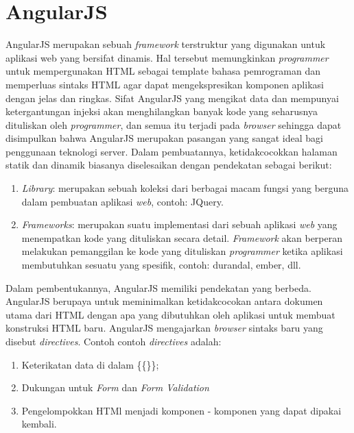 	
\section{AngularJS}
\label{sec: angularJS}
	
	AngularJS merupakan sebuah \textit{framework} terstruktur yang digunakan untuk aplikasi web yang bersifat dinamis. Hal tersebut memungkinkan \textit{programmer} untuk mempergunakan HTML sebagai template bahasa pemrograman dan memperluas sintaks HTML agar dapat mengekspresikan komponen aplikasi dengan jelas dan ringkas. Sifat AngularJS yang mengikat data dan mempunyai ketergantungan injeksi akan menghilangkan banyak kode yang seharusnya dituliskan oleh \textit{programmer}, dan semua itu terjadi pada \textit{browser} sehingga dapat disimpulkan bahwa AngularJS merupakan pasangan yang sangat ideal bagi penggunaan teknologi server. 
	Dalam pembuatannya, ketidakcocokkan halaman statik dan dinamik biasanya diselesaikan dengan pendekatan sebagai berikut:
	\begin{enumerate}
		\item \textit{Library}: merupakan sebuah koleksi dari berbagai macam fungsi yang berguna dalam pembuatan aplikasi \textit{web}, contoh: JQuery.
		\item \textit{Frameworks}: merupakan suatu implementasi dari sebuah aplikasi \textit{web} yang menempatkan kode yang dituliskan secara detail. \textit{Framework} akan berperan melakukan pemanggilan ke kode yang dituliskan \textit{programmer} ketika aplikasi membutuhkan sesuatu yang spesifik, contoh: durandal, ember, dll.
	\end{enumerate}
	
	Dalam pembentukannya, AngularJS memiliki pendekatan yang berbeda. AngularJS berupaya untuk meminimalkan ketidakcocokan antara dokumen utama dari HTML dengan apa yang dibutuhkan oleh aplikasi untuk membuat konstruksi HTML baru. AngularJS mengajarkan \textit{browser} sintaks baru yang disebut \textit{directives}. Contoh contoh \textit{directives} adalah:
	\begin{enumerate}
		\item Keterikatan data di dalam \{\{\}\};
		\item Dukungan untuk \textit{Form} dan \textit{Form Validation}
		\item Pengelompokkan HTMl menjadi komponen - komponen yang dapat dipakai kembali.
	\end{enumerate}
	
